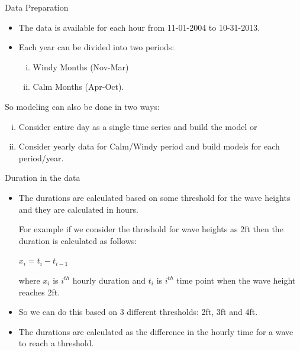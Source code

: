 \documentclass[
  ignorenonframetext,
]{beamer}
\providecommand{\tightlist}{%
  \setlength{\itemsep}{0pt}\setlength{\parskip}{0pt}}
\begin{document}
\begin{frame}{Data Preparation}
\protect\hypertarget{data-preparation}{}
\begin{itemize}
\item
  The data is available for each hour from 11-01-2004 to 10-31-2013.
\item
  Each year can be divided into two periods:

  \begin{enumerate}
  [(i)]
  \tightlist
  \item
    Windy Months (Nov-Mar)
  \item
    Calm Months (Apr-Oct).
  \end{enumerate}
\end{itemize}

So modeling can also be done in two ways:

\begin{enumerate}
[(i)]
\item
  Consider entire day as a single time series and build the model or
\item
  Consider yearly data for Calm/Windy period and build models for each
  period/year.
\end{enumerate}
\end{frame}

\begin{frame}{Duration in the data}
\protect\hypertarget{duration-in-the-data}{}
\begin{itemize}
\item
  The durations are calculated based on some threshold for the wave
  heights and they are calculated in hours.

  For example if we consider the threshold for wave heights as 2ft then
  the duration is calculated as follows:

  \(x_i = t_i - t_{i-1}\)

  where \(x_i\) is \(i^{th}\) hourly duration and \(t_i\) is \(i^{th}\)
  time point when the wave height reaches 2ft.
\item
  So we can do this based on 3 different thresholds: 2ft, 3ft and 4ft.
\item
  The durations are calculated as the difference in the hourly time for
  a wave to reach a threshold.
\end{itemize}
\end{frame}
\end{document}

